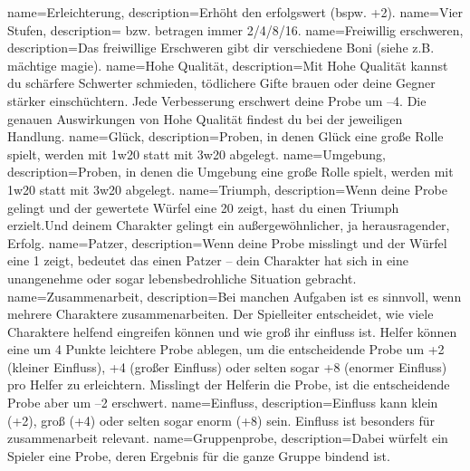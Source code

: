 {
    name={Erleichterung},
    description={Erhöht den \gls{erfolgswert} (bspw. +2).}}
{
    name={Vier Stufen},
    description={ bzw.  betragen immer 2/4/8/16.}}
{
    name={Freiwillig erschweren},
    description={Das freiwillige Erschweren gibt dir verschiedene Boni (siehe z.B. \gls{mächtige magie}).}}
{
    name={Hohe Qualität},
    description={Mit Hohe Qualität kannst du schärfere Schwerter schmieden, tödlichere Gifte brauen oder deine Gegner stärker \gls{einschüchtern}. Jede Verbesserung erschwert deine Probe um –4. Die genauen Auswirkungen von Hohe Qualität findest du bei der jeweiligen Handlung.}}
{
    name={Glück},
    description={Proben, in denen Glück eine große Rolle spielt, werden mit \gls{1w20} statt mit \gls{3w20} abgelegt.}}
{
    name={Umgebung},
    description={Proben, in denen die Umgebung eine große Rolle spielt, werden mit \gls{1w20} statt mit \gls{3w20} abgelegt.}}
{
    name={Triumph},
    description={Wenn deine Probe gelingt und der gewertete Würfel eine 20 zeigt, hast du einen Triumph erzielt.Und deinem Charakter gelingt ein außergewöhnlicher, ja herausragender, Erfolg.}}
{
    name={Patzer},
    description={Wenn deine Probe misslingt und der Würfel eine 1 zeigt, bedeutet das einen Patzer – dein Charakter hat sich in eine unangenehme oder sogar lebensbedrohliche Situation gebracht.}}
{
    name={Zusammenarbeit},
    description={Bei manchen Aufgaben ist es sinnvoll, wenn mehrere Charaktere zusammenarbeiten. Der Spielleiter entscheidet,
wie viele Charaktere helfend eingreifen können und wie groß ihr \gls{einfluss} ist. Helfer können eine um 4 Punkte leichtere Probe ablegen, um die entscheidende Probe um +2 (kleiner Einfluss), +4 (großer Einfluss) oder selten sogar +8 (enormer Einfluss) pro Helfer zu erleichtern. Misslingt der Helferin die Probe, ist die entscheidende Probe aber um –2 erschwert.}}
{
    name={Einfluss},
    description={Einfluss kann klein (+2), groß (+4) oder selten sogar enorm (+8) sein. Einfluss ist besonders für \gls{zusammenarbeit} relevant.}}
{
    name={Gruppenprobe},
    description={Dabei würfelt ein Spieler eine Probe, deren Ergebnis für die ganze Gruppe bindend ist.}}

